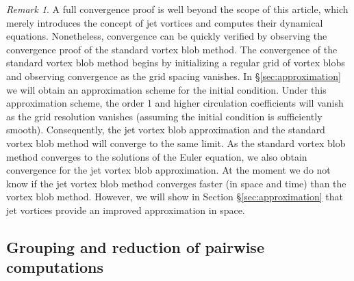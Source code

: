 \documentclass[12pt]{amsart}
\theoremstyle{remark}
\newtheorem{rmk}[thm]{Remark}
\begin{document}
\begin{rmk}
A full convergence proof is well beyond the scope of this article,
which merely introduces the concept of jet vortices and computes their dynamical equations.
Nonetheless, convergence can be quickly verified by observing the convergence proof of the standard vortex blob method.
The convergence of the standard vortex blob method begins by initializing a regular grid of vortex blobs
and observing convergence as the grid spacing vanishes.
In \S \ref{sec:approximation} we will obtain an approximation scheme for the initial condition.
Under this approximation scheme, the order 1 and higher circulation coefficients will vanish as the 
grid resolution vanishes (assuming the initial condition is sufficiently smooth).
Consequently, the jet vortex blob approximation and the standard vortex blob method will converge to the same limit.
As the standard vortex blob method converges to the solutions of the Euler equation, we also obtain convergence for the jet vortex blob approximation.
At the moment we do not know if the jet vortex blob method converges faster (in space and time) than the vortex blob method.
However, we will show in Section \S \ref{sec:approximation} that jet vortices provide an improved approximation in space.
\end{rmk}

\subsection{Grouping and reduction of pairwise computations}
\label{sec:grouping}
\end{document}

